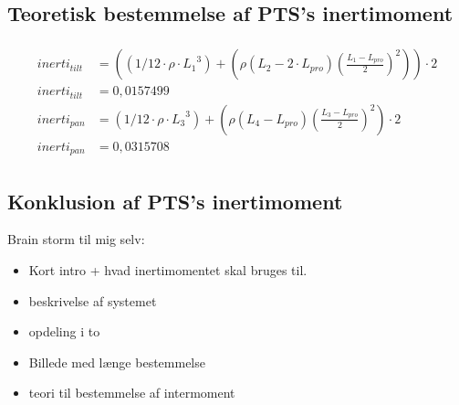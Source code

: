 \subsection{Teoretisk bestemmelse af PTS's inertimoment}

\begin{align}
\label{eq:inerti_tilt_pan}
\begin{split}
{ inerti }_{ tilt } &= \left( \left( 1/12\cdot \rho \cdot { {L_{1}} }^{ 3 } \right) +\left( \rho \left( {L_{2}}-2\cdot {L_{pro}} \right) { \left( \frac { {L_{1}}-{L_{pro}}}{ 2 }  \right)  }^{ 2 } \right)  \right) \cdot 2
\\
{ inerti }_{ tilt } &= 0,0157499
\\
{ inerti }_{ pan }&=\left( 1/12\cdot \rho \cdot { { L }_{ 3 } }^{ 3 } \right) +\left( \rho \left( { L }_{ 4 }-{ L }_{ pro } \right) { \left( \frac { { L }_{ 3 }-{ L }_{ pro } }{ 2 }  \right)  }^{ 2 } \right) \cdot 2
\\
{ inerti }_{ pan } &=0,0315708
\end{split}
\end{align}


\subsection{Konklusion af PTS's inertimoment}





\newpage
Brain storm til mig selv: 
\begin{itemize}
\item Kort intro + hvad inertimomentet skal bruges til.
\item beskrivelse af systemet
\item opdeling i to
\item Billede med længe bestemmelse
\item teori til bestemmelse af intermoment
\end{itemize}
